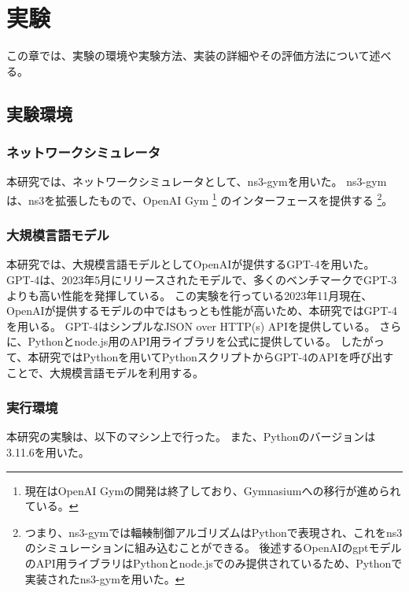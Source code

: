 \documentclass[a4paper,11pt]{jreport}
\begin{document}
\newpage

\chapter{実験}

この章では、実験の環境や実験方法、実装の詳細やその評価方法について述べる。

\section{実験環境}

\subsection{ネットワークシミュレータ}

本研究では、ネットワークシミュレータとして、ns3-gym\cite{ns3gym}を用いた。
ns3-gymは、ns3\cite{ns3-2012, ns3-2010}を拡張したもので、OpenAI Gym\cite{gym}
\footnote{現在はOpenAI Gymの開発は終了しており、Gymnasiumへの移行が進められている。}
のインターフェースを提供する
\footnote{つまり、ns3-gymでは輻輳制御アルゴリズムはPythonで表現され、これをns3のシミュレーションに組み込むことができる。
後述するOpenAIのgptモデルのAPI用ライブラリはPythonとnode.jsでのみ提供されているため、Pythonで実装されたns3-gymを用いた。
}。


\subsection{大規模言語モデル}

本研究では、大規模言語モデルとしてOpenAIが提供するGPT-4を用いた。
GPT-4\cite{gpt4}は、2023年5月にリリースされたモデルで、多くのベンチマークでGPT-3よりも高い性能を発揮している。
この実験を行っている2023年11月現在、OpenAIが提供するモデルの中ではもっとも性能が高いため、本研究ではGPT-4を用いる。
GPT-4はシンプルなJSON over HTTP(s) APIを提供している。
さらに、Pythonとnode.js用のAPI用ライブラリを公式に提供している。
したがって、本研究ではPythonを用いてPythonスクリプトからGPT-4のAPIを呼び出すことで、大規模言語モデルを利用する。

\subsection{実行環境}

本研究の実験は、以下のマシン上で行った。
また、Pythonのバージョンは3.11.6を用いた。
\end{document}

